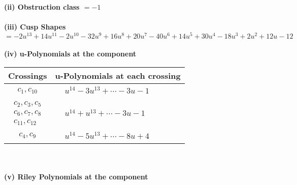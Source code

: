 \documentclass[1p]{elsarticle_modified}
\theoremstyle{definition}
\begin{document}
\flushleft \textbf{(ii) Obstruction class $= -1$}\\~\\
\flushleft \textbf{(iii) Cusp Shapes $= -2 u^{13}+14 u^{11}-2 u^{10}-32 u^9+16 u^8+20 u^7-40 u^6+14 u^5+30 u^4-18 u^3+2 u^2+12 u-12$}\\~\\
\newpage\renewcommand{\arraystretch}{1}
\flushleft \textbf{(iv) u-Polynomials at the component}\newline \\
\begin{tabular}{m{50pt}|m{274pt}}
Crossings & \hspace{64pt}u-Polynomials at each crossing \\
\hline $$\begin{aligned}c_{1},c_{10}\end{aligned}$$&$\begin{aligned}
&u^{14}-3 u^{13}+\cdots-3 u-1
\end{aligned}$\\
\hline $$\begin{aligned}c_{2},c_{3},c_{5}\\c_{6},c_{7},c_{8}\\c_{11},c_{12}\end{aligned}$$&$\begin{aligned}
&u^{14}+u^{13}+\cdots-3 u-1
\end{aligned}$\\
\hline $$\begin{aligned}c_{4},c_{9}\end{aligned}$$&$\begin{aligned}
&u^{14}-5 u^{13}+\cdots-8 u+4
\end{aligned}$\\
\hline
\end{tabular}\\~\\
\newpage\renewcommand{\arraystretch}{1}
\flushleft \textbf{(v) Riley Polynomials at the component}\newline \\
\end{document}

